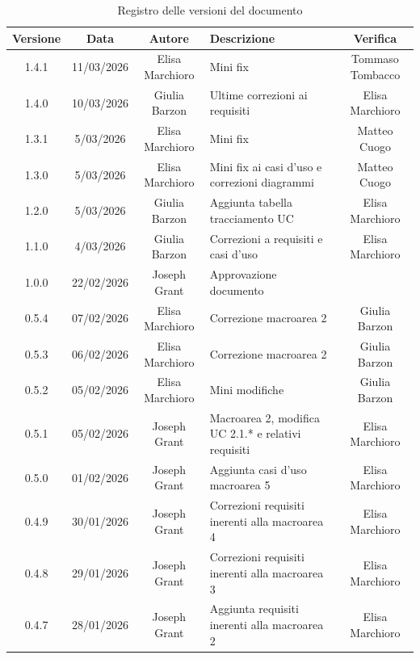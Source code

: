 \documentclass[11pt,a4paper]{article}
\begin{document}
\begin{longtable}[H]{|c|c|c|>{\raggedright\arraybackslash}p{}|c|}
    \caption{Registro delle versioni del documento}
    \label{tab:versionamento} \\
        \hline
        \textbf{Versione} & \textbf{Data} & \textbf{Autore} & \textbf{Descrizione} & \textbf{Verifica} \\
        \hline
        1.4.1 & 11/03/2026 & Elisa Marchioro & Mini fix & Tommaso Tombacco \\
        \hline
        1.4.0 & 10/03/2026 & Giulia Barzon & Ultime correzioni ai requisiti & Elisa Marchioro \\
        \hline
        1.3.1 & 5/03/2026 & Elisa Marchioro & Mini fix & Matteo Cuogo\\
        \hline
        1.3.0 & 5/03/2026 & Elisa Marchioro & Mini fix ai casi d'uso e correzioni diagrammi & Matteo Cuogo\\
        \hline
        1.2.0 & 5/03/2026 & Giulia Barzon & Aggiunta tabella tracciamento UC & Elisa Marchioro\\
        \hline
        1.1.0 & 4/03/2026 & Giulia Barzon & Correzioni a requisiti e casi d'uso & Elisa Marchioro\\
        \hline
        1.0.0 & 22/02/2026 & Joseph Grant & Approvazione documento & \\
        \hline
        0.5.4 & 07/02/2026 & Elisa Marchioro & Correzione macroarea 2 & Giulia Barzon\\
        \hline
        0.5.3 & 06/02/2026 & Elisa Marchioro & Correzione macroarea 2 & Giulia Barzon\\
        \hline
        0.5.2 & 05/02/2026 & Elisa Marchioro & Mini modifiche & Giulia Barzon\\
        \hline
        0.5.1 & 05/02/2026 & Joseph Grant & Macroarea 2, modifica UC 2.1.* e relativi requisiti & Elisa Marchioro\\
        \hline
        0.5.0 & 01/02/2026 & Joseph Grant & Aggiunta casi d'uso macroarea 5 & Elisa Marchioro\\
        \hline
        0.4.9 & 30/01/2026 & Joseph Grant & Correzioni requisiti inerenti alla macroarea 4 & Elisa Marchioro\\
        \hline
        0.4.8 & 29/01/2026 & Joseph Grant & Correzioni requisiti inerenti alla macroarea 3 & Elisa Marchioro\\
        \hline
        0.4.7 & 28/01/2026 & Joseph Grant & Aggiunta requisiti inerenti alla macroarea 2 & Elisa Marchioro\\

\end{longtable}
\end{document}
